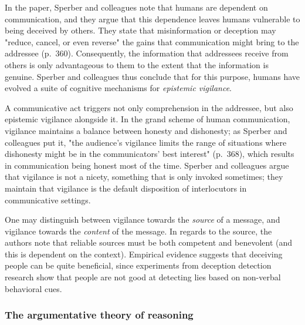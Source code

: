 In the paper, Sperber and colleagues note that humans are dependent on communication, and they argue that this dependence leaves humans vulnerable to being deceived by others.
They state that misinformation or deception may "reduce, cancel, or even reverse" the gains that communication might bring to the addressee (p.~360).
Consequently, the information that addressees receive from others is only advantageous to them to the extent that the information is genuine.
Sperber and colleagues thus conclude that for this purpose, humans have evolved a suite of cognitive mechanisms for \emph{epistemic vigilance}.

A communicative act triggers not only comprehension in the addressee, but also epistemic vigilance alongside it.
In the grand scheme of human communication, vigilance maintains a balance between honesty and dishonesty; as Sperber and colleagues put it, "the audience's vigilance limits the range of situations where dishonesty might be in the communicators' best interest" (p.~368), which results in communication being honest most of the time.
Sperber and colleagues argue that vigilance is not a nicety, something that is only invoked sometimes; they maintain that vigilance is the default disposition of interlocutors in communicative settings.

One may distinguish between vigilance towards the \emph{source} of a message, and vigilance towards the \emph{content} of the message.
In regards to the source, the authors note that reliable sources must be both competent and benevolent (and this is dependent on the context).
Empirical evidence suggests that deceiving people can be quite beneficial, since experiments from deception detection research show that people are not good at detecting lies based on non-verbal behavioral cues.

\subsubsection{The argumentative theory of reasoning}

